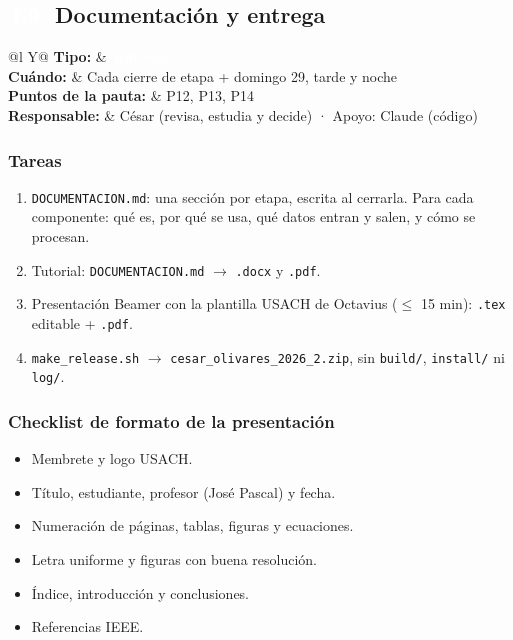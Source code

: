 \documentclass[11pt,a4paper]{article}
\makeatletter
\newcommand{\pill}[2]{{\setlength{\fboxsep}{1.6pt}\colorbox{#1}{\textcolor{white}{\footnotesize\bfseries\,#2\,}}}}
\newcommand{\En}{\pill{cEntrega}{E9}}
\newcommand{\ficha}[4]{%
  \begin{tabularx}{\linewidth}{@{}l Y@{}}
  \textbf{Tipo:} & \pill{#1}{#2}\\
  \textbf{Cuándo:} & #3\\
  \textbf{Puntos de la pauta:} & #4\\
  \textbf{Responsable:} & César (revisa, estudia y decide) · Apoyo: Claude (código)\\
  \end{tabularx}\par}
\makeatother
\begin{document}
\subsection{\texorpdfstring{\En\ }{E9 }Documentación y entrega}\label{sec:entrega}
\ficha{cEntrega}{Entrega}{Cada cierre de etapa + domingo 29, tarde y noche}{P12, P13, P14}

\subsubsection{Tareas}
\begin{enumerate}[label=T\arabic*]
  \item \texttt{DOCUMENTACION.md}: una sección por etapa, escrita al cerrarla. Para cada componente: qué es, por qué se usa, qué datos entran y salen, y cómo se procesan.
  \item Tutorial: \texttt{DOCUMENTACION.md} $\rightarrow$ \texttt{.docx} y \texttt{.pdf}.
  \item Presentación Beamer con la plantilla USACH de Octavius ($\leq$ 15 min): \texttt{.tex} editable + \texttt{.pdf}.
  \item \texttt{make\_release.sh} $\rightarrow$ \texttt{cesar\_olivares\_2026\_2.zip}, sin \texttt{build/}, \texttt{install/} ni \texttt{log/}.
\end{enumerate}

\subsubsection{Checklist de formato de la presentación}
\begin{itemize}
  \item Membrete y logo USACH.
  \item Título, estudiante, profesor (José Pascal) y fecha.
  \item Numeración de páginas, tablas, figuras y ecuaciones.
  \item Letra uniforme y figuras con buena resolución.
  \item Índice, introducción y conclusiones.
  \item Referencias IEEE.
\end{itemize}
\end{document}
